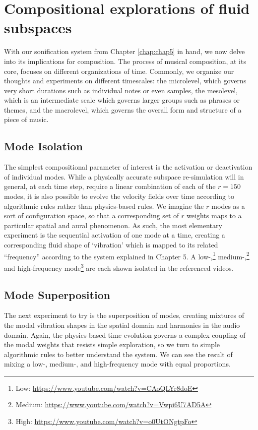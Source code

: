\chapter[Compositional exploration of fluid subspaces]{Compositional explorations of fluid subspaces}
\label{chap:chap6}

With our sonification system from Chapter \ref{chap:chap5} in hand, we now delve into its implications for composition. The process of musical composition, at its core, focuses on different
organizations of time. Commonly, we organize our thoughts and experiments on different timescales: the microlevel, which governs very short durations such as individual notes
or even samples, the mesolevel, which is an intermediate scale which governs larger groups such as phrases or themes, and the macrolevel, which governs the overall form and structure of a piece of music. 

\section{Mode Isolation}
The simplest compositional parameter of interest is the activation or deactivation of individual modes. While a physically accurate subspace re-simulation will in general, at each time step, require a linear combination of each of the $r = 150$ modes, it is also possible to evolve the velocity fields over time according to algorithmic rules rather than physics-based rules. We imagine the $r$ modes as a sort of configuration space, so that a corresponding set of $r$ weights maps to a particular spatial and aural phenomenon. As such, the most elementary experiment is the sequential activation of one mode at a time, creating a corresponding fluid shape of `vibration' which is mapped to its related ``frequency'' according to the system explained in Chapter 5. A low-,\footnote{Low: \url{https://www.youtube.com/watch?v=CAoQLYr8doE}}  medium-,\footnote{Medium: \url{https://www.youtube.com/watch?v=Vwpi6U7AD5A}} and high-frequency mode\footnote{High: \url{https://www.youtube.com/watch?v=o0UtONgtpFo}} are each shown isolated in the referenced videos.  

\section{Mode Superposition}
The next experiment to try is the superposition of modes, creating mixtures of the modal vibration shapes in the spatial domain and harmonies in the audio domain. Again, the physics-based time evolution governs a complex coupling of the modal weights that resists simple exploration, so we turn to simple algorithmic rules to better understand the system. We can see the result of mixing a low-, medium-, and high-frequency mode with equal proportions.

